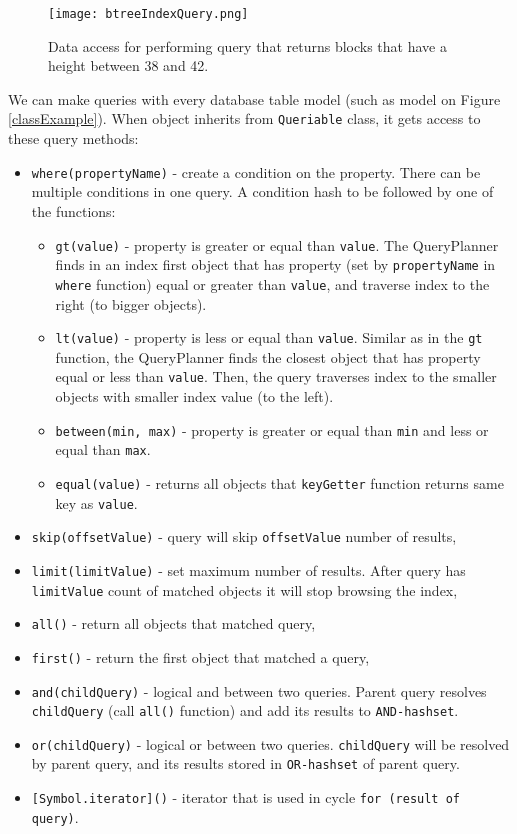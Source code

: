 \begin{figure}[h]
    \centering
    \texttt{[image: btreeIndexQuery.png]}
    \caption{Data access for performing query that returns blocks that have a height between 38 and 42.}
    \label{btreeQuery}
\end{figure}


We can make queries with every database table model (such as model on Figure \ref{classExample}). When object inherits from \texttt{Queriable} class, it gets access to these query methods:
\begin{itemize}
    \item \texttt{where(propertyName)} - create a condition on the property. There can be multiple conditions in one query. A condition hash to be followed by one of the functions: 
    \begin{itemize}
        \item \texttt{gt(value)} - property is greater or equal than \texttt{value}. The QueryPlanner finds in an index first object that has property (set by \texttt{propertyName} in \texttt{where} function) equal or greater than \texttt{value}, and traverse index to the right (to bigger objects).
        \item \texttt{lt(value)} - property is less or equal than \texttt{value}. Similar as in the \texttt{gt} function, the QueryPlanner finds the closest object that has property equal or less than \texttt{value}. Then, the query traverses index to the smaller objects with smaller index value (to the left).
        \item \texttt{between(min, max)} - property is greater or equal than \texttt{min} and less or equal than \texttt{max}. 
        \item \texttt{equal(value)} - returns all objects that \texttt{keyGetter} function returns same key as \texttt{value}. 
    \end{itemize}
    \item \texttt{skip(offsetValue)} - query will skip \texttt{offsetValue} number of results,
    \item \texttt{limit(limitValue)} - set maximum number of results. After query has \texttt{limitValue} count of matched objects it will stop browsing the index,
    \item \texttt{all()} - return all objects that matched query,
    \item \texttt{first()} - return the first object that matched a query,
    \item \texttt{and(childQuery)} - logical and between two queries. Parent query resolves \texttt{childQuery} (call \texttt{all()} function) and add its results to \texttt{AND-hashset}.
    \item \texttt{or(childQuery)} - logical or between two queries. \texttt{childQuery} will be resolved by parent query, and its results stored in \texttt{OR-hashset} of parent query. 
    \item \texttt{[Symbol.iterator]()} - iterator that is used in cycle \texttt{for (result of query)}.
\end{itemize}

